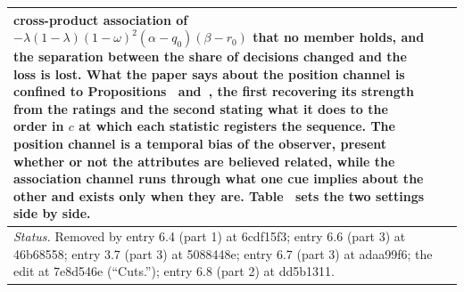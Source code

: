 \documentclass[10pt]{article}
\theoremstyle{definition}
\renewcommand{\ref}[1]{\textsc{\detokenize{#1}}}
\newlength{\fullw}\setlength{\fullw}{25.9cm}
\begin{document}
{\begin{longtable}{|p{0.9cm}|p{12.2cm}|p{12.2cm}|}
cross-product association of $-\lambda(1-\lambda)(1-\omega)^2(\alpha-q_0)(\beta-r_0)$ that no member holds, and the separation between the share of decisions changed and the loss is lost. What the paper says about the position channel is confined to Propositions~\ref{prop:ADJ} and~\ref{prop:LAD}, the first recovering its strength from the ratings and the second stating what it does to the order in $c$ at which each statistic registers the sequence. The position channel is a temporal bias of the observer, present whether or not the attributes are believed related, while the association channel runs through what one cue implies about the other and exists only when they are. Table~\ref{tab:settings} sets the two settings side by side. \\ \hline
\multicolumn{3}{|p{\fullw}|}{\textit{Status.} Removed by entry 6.4 (part 1) at 6cdf15f3; entry 6.6 (part 3) at 46b68558; entry 3.7 (part 3) at 5088448e; entry 6.7 (part 3) at adaa99f6; the edit at 7e8d546e (``Cuts.''); entry 6.8 (part 2) at dd5b1311.} \\ \hline

\end{longtable}}
\end{document}
